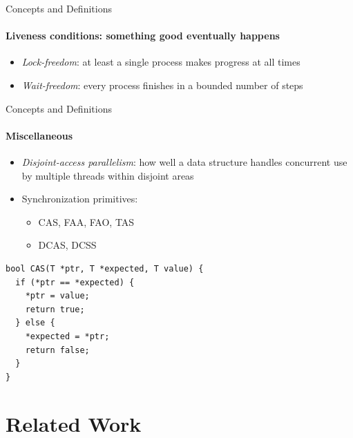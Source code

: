 \documentclass[usenames,dvipsnames]{beamer}
\begin{document}
\begin{frame}{Concepts and Definitions}
\framesubtitle{Liveness conditions: something good eventually happens}

\begin{itemize}
\item \emph{Lock-freedom}: at least a single process makes progress at all times
\item \emph{Wait-freedom}: every process finishes in a bounded number of steps
\end{itemize}
\end{frame}

\begin{frame}[fragile]{Concepts and Definitions}
\framesubtitle{Miscellaneous}

\begin{itemize}
\item \emph{Disjoint-access parallelism}: how well a data structure handles concurrent use by multiple
      threads within disjoint areas
\item Synchronization primitives:
    \begin{itemize}
    \item \ac{CAS}, \ac{FAA}, \ac{FAO}, \ac{TAS}
    \item \ac{DCAS}, \ac{DCSS}
    \end{itemize}
\end{itemize}

\begin{lstlisting}
bool CAS(T *ptr, T *expected, T value) {
  if (*ptr == *expected) {
    *ptr = value;
    return true;
  } else {
    *expected = *ptr;
    return false;
  }
}
\end{lstlisting}
\end{frame}

\section{Related Work} \label{sec:related}
\end{document}
